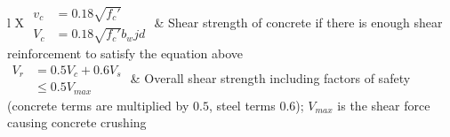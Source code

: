 \documentclass[twocolumn]{article}
\begin{document}
\begin{tabularx}{\linewidth}{l X}
    \(\begin{aligned}
        v_c &= 0.18\sqrt{f_c'} \\
        V_c &= 0.18\sqrt{f_c'}b_wjd
    \end{aligned}\) & Shear strength of concrete if there is enough shear reinforcement to satisfy the equation above \\
    \(\begin{aligned}
        V_r &= 0.5V_c + 0.6V_s \\
            & \leq 0.5V_{max}
    \end{aligned}\) & Overall shear strength including factors of safety (concrete terms are
        multiplied by \(0.5\), steel terms \(0.6\)); \(V_{max}\) is the shear force causing concrete crushing \\
\end{tabularx}
\end{document}
